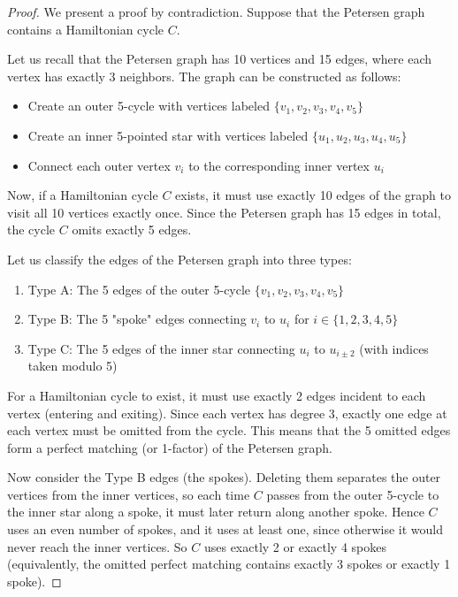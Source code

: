 \documentclass{article}
\theoremstyle{definition}
\begin{document}
\begin{proof}
We present a proof by contradiction. Suppose that the Petersen graph contains a Hamiltonian cycle $C$.

Let us recall that the Petersen graph has 10 vertices and 15 edges, where each vertex has exactly 3 neighbors. The graph can be constructed as follows:
\begin{itemize}
    \item Create an outer 5-cycle with vertices labeled $\{v_1, v_2, v_3, v_4, v_5\}$
    \item Create an inner 5-pointed star with vertices labeled $\{u_1, u_2, u_3, u_4, u_5\}$
    \item Connect each outer vertex $v_i$ to the corresponding inner vertex $u_i$
\end{itemize}

Now, if a Hamiltonian cycle $C$ exists, it must use exactly 10 edges of the graph to visit all 10 vertices exactly once. Since the Petersen graph has 15 edges in total, the cycle $C$ omits exactly 5 edges.

Let us classify the edges of the Petersen graph into three types:
\begin{enumerate}
    \item Type A: The 5 edges of the outer 5-cycle $\{v_1, v_2, v_3, v_4, v_5\}$
    \item Type B: The 5 "spoke" edges connecting $v_i$ to $u_i$ for $i \in \{1,2,3,4,5\}$
    \item Type C: The 5 edges of the inner star connecting $u_i$ to $u_{i \pm 2}$ (with indices taken modulo 5)
\end{enumerate}

For a Hamiltonian cycle to exist, it must use exactly 2 edges incident to each vertex (entering and exiting). Since each vertex has degree 3, exactly one edge at each vertex must be omitted from the cycle. This means that the 5 omitted edges form a perfect matching (or 1-factor) of the Petersen graph.

Now consider the Type B edges (the spokes). Deleting them separates the outer vertices from the inner vertices, so each time $C$ passes from the outer 5-cycle to the inner star along a spoke, it must later return along another spoke. Hence $C$ uses an even number of spokes, and it uses at least one, since otherwise it would never reach the inner vertices. So $C$ uses exactly 2 or exactly 4 spokes (equivalently, the omitted perfect matching contains exactly 3 spokes or exactly 1 spoke).


\end{proof}
\end{document}
